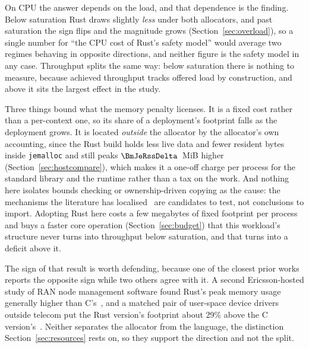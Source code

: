 On CPU the answer depends on the load, and that dependence is the finding. Below saturation Rust
draws slightly \emph{less} under both allocators, and past saturation the sign flips and the
magnitude grows (Section~\ref{sec:overload}), so a single number for ``the CPU cost of Rust's
safety model'' would average two regimes behaving in opposite directions, and neither figure is
the safety model in any case. Throughput splits the same way: below saturation there is nothing to
measure, because achieved throughput tracks offered load by construction, and above it sits the
largest effect in the study.

Three things bound what the memory penalty licenses. It is a fixed cost rather than a per-context
one, so its share of a deployment's footprint falls as the deployment grows. It is located
\emph{outside} the allocator by the allocator's own accounting, since the Rust build holds less
live data and fewer resident bytes inside \texttt{jemalloc} and still peaks $\BmJeRssDelta$~MiB
higher (Section~\ref{sec:hostcompare}), which makes it a one-off charge per process for the
standard library and the runtime rather than a tax on the work. And nothing here isolates bounds
checking or ownership-driven copying as the cause: the mechanisms the literature has
localised~\cite{zhang2022runtime,harris2023morello} are candidates to test, not conclusions to
import. Adopting Rust here costs a few megabytes of fixed footprint per process and buys a faster
core operation (Section~\ref{sec:budget}) that this workload's structure never turns into
throughput below saturation, and that turns into a deficit above it.

The sign of that result is worth defending, because one of the closest prior works reports the
opposite sign while two others agree with it. A second Ericsson-hosted study of RAN node
management software found Rust's peak memory usage generally higher than
C's~\cite{olsson2023ranmgmt}, and a matched pair of user-space device drivers outside telecom put
the Rust version's footprint about 29\% above the C version's~\cite{sundvisson2026drivers}.
Neither separates the allocator from the language, the distinction Section~\ref{sec:resources}
rests on, so they support the direction and not the split.

